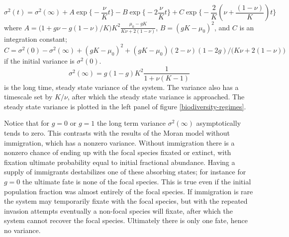 \begin{equation*}
 \sigma^2(t) = \sigma^2(\infty) + A\exp\Bigg\{-\frac{\nu}{K}t\Bigg\} - B\exp\Bigg\{-2\frac{\nu}{K}t\Bigg\} + C\exp\Bigg\{-\frac{2}{K}\left(\nu+\frac{(1-\nu)}{K}\right)t\Bigg\}
\end{equation*}
where $A=\big(1+g\nu-g(1-\nu)/K\big)K^2\frac{\mu_0-gK}{K\nu+2(1-\nu)}$, $B=(gK-\mu_0)^2$, and $C$ is an integration constant; $C = \sigma^2(0) - \sigma^2(\infty) + (gK-\mu_0)^2 + (gK-\mu_0)(2-\nu)(1-2g)/\big(K\nu+2(1-\nu)\big)$ if the initial variance is $\sigma^2(0)$. 
\begin{equation}
\sigma^2(\infty) = g(1-g) K^2\frac{1}{1+\nu(K-1)}
\end{equation}
is the long time, steady state variance of the system. 
The variance also has a timescale set by $K/\nu$, after which the steady state variance is approached. 
The steady state variance is plotted in the left panel of figure \ref{biodiversity-regimes}. 


Notice that for $g=0$ or $g=1$ the long term variance $\sigma^2(\infty)$ asymptotically tends to zero. 
This contrasts with the results of the Moran model without immigration, which has a nonzero variance. 
Without immigration there is a nonzero chance of ending up with the focal species fixated or extinct, with fixation ultimate probability equal to initial fractional abundance. 
Having a supply of immigrants destabilizes one of these absorbing states; for instance for $g=0$ the ultimate fate is none of the focal species. %
This is true even if the initial population fraction was almost entirely of the focal species. If immigration is rare the system may temporarily fixate with the focal species, but with the repeated invasion attempts eventually a non-focal species will fixate, after which the system cannot recover the focal species. 
Ultimately there is only one fate, hence no variance. 

